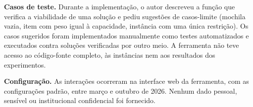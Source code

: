 \textbf{Casos de teste.} Durante a implementação, o autor descreveu a função
que verifica a viabilidade de uma solução e pediu sugestões de casos-limite
(mochila vazia, item com peso igual à capacidade, instância com uma única
restrição). Os casos sugeridos foram implementados manualmente como testes
automatizados e executados contra soluções verificadas por outro meio. A
ferramenta não teve acesso ao código-fonte completo, às instâncias nem aos
resultados dos experimentos.

\textbf{Configuração.} As interações ocorreram na interface web da ferramenta,
com as configurações padrão, entre março e outubro de 2026. Nenhum dado
pessoal, sensível ou institucional confidencial foi fornecido.
